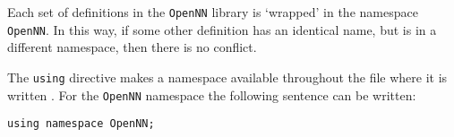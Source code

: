 
Each set of definitions in the \texttt{OpenNN} library is `wrapped'
in the namespace \lstinline"OpenNN". In this way, if some other
definition has an identical name, but is in a different namespace,
then there is no conflict.

The \lstinline"using" directive makes a namespace available
throughout the file where it is written \cite{Eckel2000}. For the
\lstinline"OpenNN" namespace the following sentence can be written:

\begin{lstlisting}
using namespace OpenNN;
\end{lstlisting}

